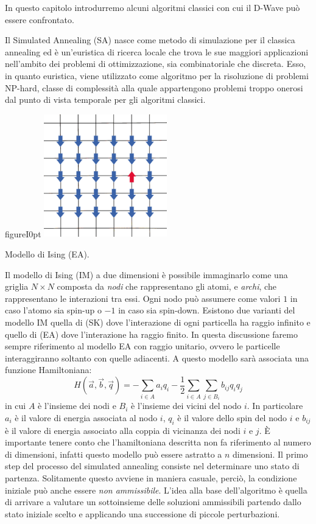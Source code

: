 In questo capitolo introdurremo alcuni algoritmi classici con cui il D-Wave può essere confrontato.

\cite{QA,ST,CODE}Il Simulated Annealing (SA) nasce come metodo di simulazione per il classica annealing ed è un’euristica di ricerca locale che trova le sue maggiori applicazioni nell’ambito dei problemi di ottimizzazione, sia combinatoriale che discreta. Esso, in quanto euristica, viene utilizzato come algoritmo per la risoluzione di problemi NP-hard, classe di complessità alla quale appartengono problemi troppo onerosi dal punto di vista temporale per gli algoritmi classici.
\begin{wrapfloat}{figure}{I}{0pt}
\includegraphics[width=0.4\textwidth]{Immagini/ising.jpg}
\caption{Modello di Ising (EA).}
\label{figura:ising}
\end{wrapfloat}
\cite{QA, CODE}Il modello di Ising (IM) a due dimensioni è possibile immaginarlo come una griglia $N \times N$ composta da \textit{nodi} che rappresentano gli atomi, e \textit{archi}, che rappresentano le interazioni tra essi. Ogni nodo può assumere come valori $1$ in caso l'atomo sia spin-up o $-1$ in caso sia spin-down. Esistono due varianti del modello IM quella di  (SK) dove l'interazione di ogni particella ha raggio infinito e quello di   (EA) dove l'interazione ha raggio finito. In questa discussione faremo sempre riferimento al modello EA con raggio unitario, ovvero le particelle interaggiranno soltanto con quelle adiacenti. A questo modello sarà associata una funzione Hamiltoniana:
$$ H(\vec{a}, \vec{b}, \vec{q}) = - \sum_{i \in A } a_i q_i - \frac{1}{2} \sum_{i \in A} \sum_{j \in B_i} b_{ij} q_i q_j $$
in cui $A$ è l'insieme dei nodi e $B_i$ è l'insieme dei vicini del nodo $i$. In particolare $a_i$ è il valore di energia associata al nodo $i$, $q_i$ è il valore dello spin del nodo $i$ e $b_{ij}$ è il valore di energia associato alla coppia di vicinanza dei nodi $i$ e $j$. È importante tenere conto che l'hamiltoniana descritta non fa riferimento al numero di dimensioni, infatti questo modello può essere astratto a $n$ dimensioni.
\cite{QA, MC, ST, CODE}Il primo step del processo del simulated annealing consiste nel determinare uno stato di
partenza. Solitamente questo avviene in maniera casuale, perciò, la condizione iniziale può anche essere \textit{non ammissibile}. L’idea alla base dell’algoritmo è quella di arrivare a valutare un sottoinsieme delle soluzioni ammissibili partendo dallo stato iniziale scelto e applicando una successione di piccole perturbazioni.

